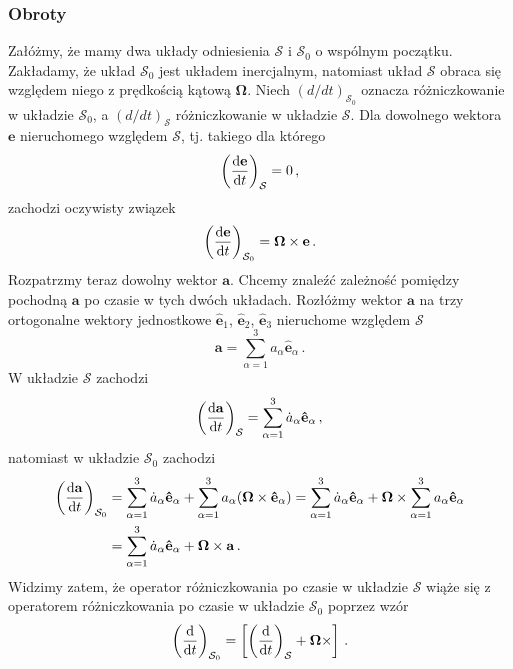 \documentclass[../main.tex]{subfiles}
\begin{document}
\subsubsection{Obroty}
Załóżmy, że mamy dwa układy odniesienia \(\mathcal{S}\) i \(\mathcal{S}_0\) o wspólnym początku. Zakładamy, że układ \(\mathcal{S}_0\) jest układem inercjalnym, natomiast układ \(\mathcal{S}\) obraca się względem niego z prędkością kątową \(\boldsymbol{\Omega}\). Niech \((d/dt)_{\mathcal{S}_0}\) oznacza różniczkowanie w układzie \(\mathcal{S}_0\), a \((d/dt)_{\mathcal{S}}\) różniczkowanie w układzie \(\mathcal{S}\). Dla dowolnego wektora \(\mathbf{e}\) nieruchomego względem \(\mathcal{S}\), tj. takiego dla którego
\begin{equation*}
    \left(\dv{\mathbf{e}}{t}\right)_{\mathcal{S}}=0\,,
\end{equation*}
zachodzi oczywisty związek
\begin{equation*}
    \left(\dv{\mathbf{e}}{t}\right)_{\mathcal{S}_0}=\boldsymbol{\Omega}\times\mathbf{e}\,.
\end{equation*}
Rozpatrzmy teraz dowolny wektor \(\mathbf{a}\). Chcemy znaleźć zależność pomiędzy pochodną \(\mathbf{a}\) po czasie w tych dwóch układach. Rozłóżmy wektor \(\mathbf{a}\) na trzy ortogonalne wektory jednostkowe \(\mathbf{\hat e}_1\), \(\mathbf{\hat e}_2\), \(\mathbf{\hat e}_3\) nieruchome względem \(\mathcal{S}\)
\begin{equation*}
    \mathbf{a}=\sum_{\alpha=1}^3a_\alpha\mathbf{\hat e}_\alpha\,.
\end{equation*}
W układzie \(\mathcal{S}\) zachodzi
\begin{equation*}
    \left(\dv{\mathbf{a}}{t}\right)_\mathcal{S}=\sum_{\alpha=1}^3\dot a_\alpha\mathbf{\hat e}_\alpha\,,
\end{equation*}
natomiast w układzie \(\mathcal{S}_0\) zachodzi
\begin{equation*}
\begin{split}
    \left(\dv{\mathbf{a}}{t}\right)_{\mathcal{S}_0}&=\sum_{\alpha=1}^3\dot a_\alpha\mathbf{\hat e}_\alpha+\sum_{\alpha=1}^3a_\alpha (\boldsymbol{\Omega}\times\mathbf{\hat e}_\alpha)=\sum_{\alpha=1}^3\dot a_\alpha\mathbf{\hat e}_\alpha+\boldsymbol{\Omega}\times\sum_{\alpha=1}^3 a_\alpha\mathbf{\hat e}_\alpha\\
    &=\sum_{\alpha=1}^3\dot a_\alpha\mathbf{\hat e}_\alpha+\boldsymbol{\Omega}\times\mathbf{a}\,.
\end{split}
\end{equation*}
Widzimy zatem, że operator różniczkowania po czasie w układzie \(\mathcal{S}\) wiąże się z operatorem różniczkowania po czasie w układzie \(\mathcal{S}_0\) poprzez wzór
\begin{equation*}
    \left(\dv{}{t}\right)_{\mathcal{S}_0}=\left[\left(\dv{}{t}\right)_\mathcal{S}+\boldsymbol{\Omega}\times\right]\,.
\end{equation*}
\end{document}
